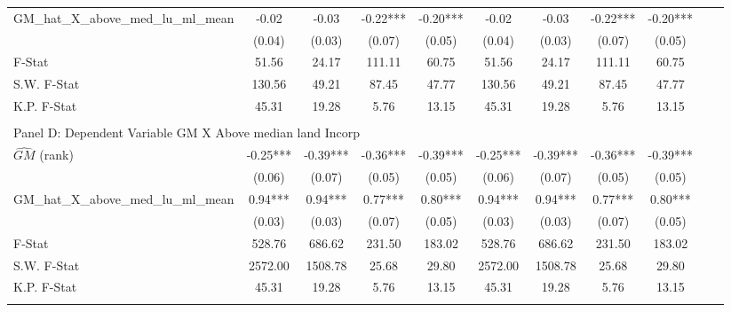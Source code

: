 \begin{table}[htbp]
\begin{threeparttable}
\begin{tabular}{l*{10}{c}}
\addlinespace
GM\_hat\_X\_above\_med\_lu\_ml\_mean&      -0.02   &      -0.03   &      -0.22***&      -0.20***&      -0.02   &      -0.03   &      -0.22***&      -0.20***\\
                &     (0.04)   &     (0.03)   &     (0.07)   &     (0.05)   &     (0.04)   &     (0.03)   &     (0.07)   &     (0.05)   \\
\midrule
F-Stat          &      51.56   &      24.17   &     111.11   &      60.75   &      51.56   &      24.17   &     111.11   &      60.75   \\
S.W. F-Stat     &     130.56   &      49.21   &      87.45   &      47.77   &     130.56   &      49.21   &      87.45   &      47.77   \\
K.P. F-Stat     &      45.31   &      19.28   &       5.76   &      13.15   &      45.31   &      19.28   &       5.76   &      13.15   \\
\cmidrule[\heavyrulewidth](lr){1-9} \\ \cmidrule[\heavyrulewidth](lr){1-9}
\multicolumn{8}{l}{Panel D: Dependent Variable GM X Above median land Incorp}\\
\cmidrule(lr){1-9}
$\hat{GM}$ (rank)&      -0.25***&      -0.39***&      -0.36***&      -0.39***&      -0.25***&      -0.39***&      -0.36***&      -0.39***\\
                &     (0.06)   &     (0.07)   &     (0.05)   &     (0.05)   &     (0.06)   &     (0.07)   &     (0.05)   &     (0.05)   \\
\addlinespace
GM\_hat\_X\_above\_med\_lu\_ml\_mean&       0.94***&       0.94***&       0.77***&       0.80***&       0.94***&       0.94***&       0.77***&       0.80***\\
                &     (0.03)   &     (0.03)   &     (0.07)   &     (0.05)   &     (0.03)   &     (0.03)   &     (0.07)   &     (0.05)   \\
\midrule
F-Stat          &     528.76   &     686.62   &     231.50   &     183.02   &     528.76   &     686.62   &     231.50   &     183.02   \\
S.W. F-Stat     &    2572.00   &    1508.78   &      25.68   &      29.80   &    2572.00   &    1508.78   &      25.68   &      29.80   \\
K.P. F-Stat     &      45.31   &      19.28   &       5.76   &      13.15   &      45.31   &      19.28   &       5.76   &      13.15   \\
\cmidrule[\heavyrulewidth](lr){1-9} \\ \cmidrule[\heavyrulewidth](lr){1-9}

\end{tabular}
\end{threeparttable}
\end{table}
